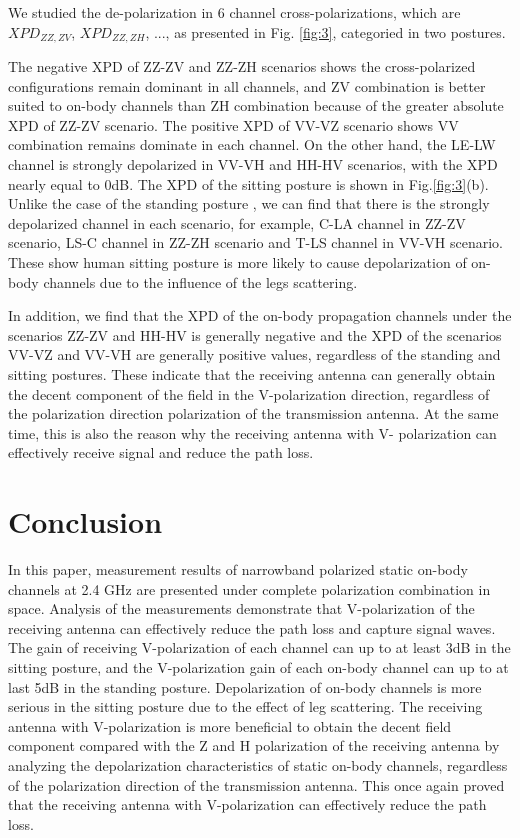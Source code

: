 \documentclass[conference]{IEEEtran}
\begin{document}
We studied the de-polarization in 6 channel cross-polarizations, which are $XPD_{ZZ,ZV}$, $XPD_{ZZ,ZH}$, ..., as presented in Fig. \ref{fig:3}, categoried in two postures.

The negative XPD of ZZ-ZV and ZZ-ZH scenarios shows the cross-polarized configurations remain dominant in all channels, and ZV combination is better suited to on-body channels than ZH combination because of the greater absolute XPD of ZZ-ZV scenario. The positive XPD of VV-VZ scenario shows VV combination remains dominate in each channel. On the other hand, the LE-LW channel is strongly depolarized in VV-VH and HH-HV scenarios, with the XPD nearly equal to 0dB. The XPD of the sitting posture is shown in Fig.\ref{fig:3}(b). Unlike the case of  the standing posture , we can find that there is the strongly depolarized channel in each scenario, for example, C-LA channel in ZZ-ZV scenario, LS-C channel in ZZ-ZH scenario and T-LS channel in VV-VH scenario. These show human sitting posture is more likely to cause depolarization of on-body channels due to the influence of the legs scattering.

In addition, we find that the XPD of the on-body propagation channels under the scenarios ZZ-ZV and HH-HV is generally negative and the XPD of the scenarios VV-VZ and VV-VH are generally positive values, regardless of the standing and sitting postures. These indicate that the receiving antenna can generally obtain the decent component of the field in the V-polarization direction, regardless of the polarization direction polarization of the transmission antenna. At the same time, this is also the reason why the receiving antenna with V- polarization can effectively receive signal and reduce the path loss.

\section{Conclusion}\label{sec:conclusion}
In this paper, measurement results of narrowband polarized static on-body channels at 2.4 GHz are presented under complete polarization combination in space. Analysis of the measurements demonstrate that V-polarization of the receiving antenna can effectively reduce the path loss and capture signal waves. The gain of receiving V-polarization of each channel can up to at least 3dB in the sitting posture, and the V-polarization gain of each on-body channel can up to at last 5dB in the standing posture. Depolarization of on-body channels is more serious in the sitting posture due to the effect of leg scattering. The receiving antenna with V-polarization is more beneficial to  obtain the decent field component compared with the Z and H polarization of the receiving antenna by analyzing the depolarization characteristics of static on-body channels, regardless of the polarization direction of the transmission antenna. This once again proved that the receiving antenna with V-polarization can effectively reduce the path loss.
\end{document}

